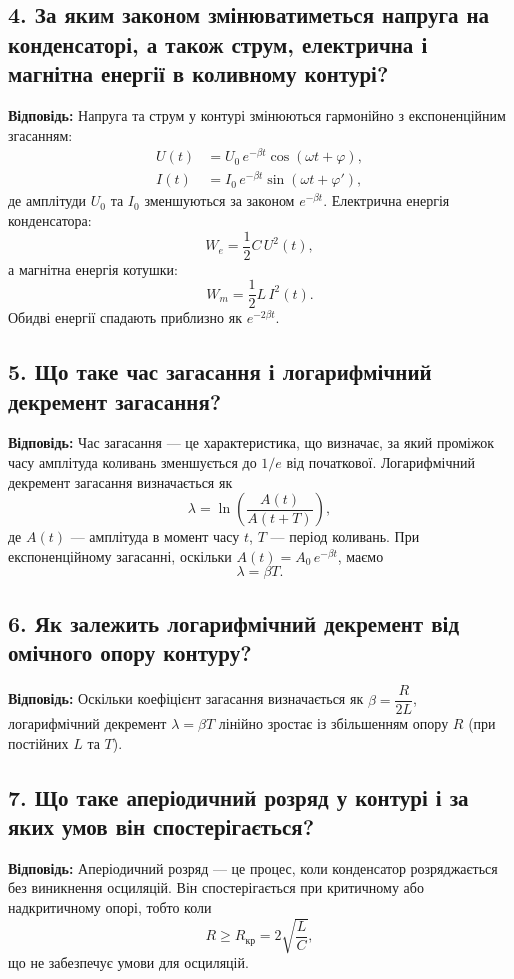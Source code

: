 \documentclass[12pt,a4paper]{article}
\begin{document}
    \subsection*{4. За яким законом змінюватиметься напруга на конденсаторі, а також струм, електрична і магнітна енергії в коливному контурі?}
    \textbf{Відповідь:}  
    Напруга та струм у контурі змінюються гармонійно з експоненційним згасанням:
    \[
    \begin{aligned}
    U(t)&=U_0\, e^{-\beta t}\cos(\omega t+\varphi),\\[1ex]
    I(t)&=I_0\, e^{-\beta t}\sin(\omega t+\varphi'),
    \end{aligned}
    \]
    де амплітуди \(U_0\) та \(I_0\) зменшуються за законом \(e^{-\beta t}\).  
    Електрична енергія конденсатора:
    \[
    W_e=\frac{1}{2}C\,U^2(t),
    \]
    а магнітна енергія котушки:
    \[
    W_m=\frac{1}{2}L\,I^2(t).
    \]
    Обидві енергії спадають приблизно як \(e^{-2\beta t}\).

    \subsection*{5. Що таке час загасання і логарифмічний декремент загасання?}
    \textbf{Відповідь:}  
    Час загасання --- це характеристика, що визначає, за який проміжок часу амплітуда коливань зменшується до \(1/e\) від початкової.  
    Логарифмічний декремент загасання визначається як
    \[
    \lambda=\ln\!\left(\frac{A(t)}{A(t+T)}\right),
    \]
    де \(A(t)\) --- амплітуда в момент часу \(t\), \(T\) --- період коливань. При експоненційному загасанні, оскільки \(A(t)=A_0\,e^{-\beta t}\), маємо
    \[
    \lambda=\beta T.
    \]

    \subsection*{6. Як залежить логарифмічний декремент від омічного опору контуру?}
    \textbf{Відповідь:}  
    Оскільки коефіцієнт загасання визначається як \(\beta=\dfrac{R}{2L}\), логарифмічний декремент
    \(\lambda=\beta T\) лінійно зростає із збільшенням опору \(R\) (при постійних \(L\) та \(T\)).

    \subsection*{7. Що таке аперіодичний розряд у контурі і за яких умов він спостерігається?}
    \textbf{Відповідь:}  
    Аперіодичний розряд --- це процес, коли конденсатор розряджається без виникнення осциляцій.  
    Він спостерігається при критичному або надкритичному опорі, тобто коли
    \[
    R \ge R_{\text{кр}} = 2\sqrt{\frac{L}{C}},
    \]
    що не забезпечує умови для осциляцій.
\end{document}
